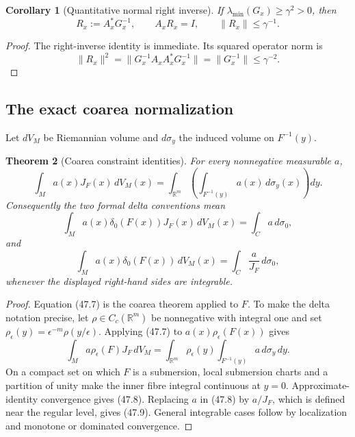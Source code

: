 \documentclass[11pt]{article}
\newtheorem{theorem}{Theorem}[section]
\newtheorem{corollary}[theorem]{Corollary}
\begin{document}
\begin{corollary}[Quantitative normal right inverse]
\label{cor:v11v47-right-inverse}
If \(\lambda_{\min}(G_x)\ge\gamma^2>0\), then
\[
             R_x:=A_x^*G_x^{-1},\qquad A_xR_x=I,\qquad
             \lVert R_x\rVert\le\gamma^{-1}.                 \tag{47.6}
\]
\end{corollary}

\begin{proof}
The right-inverse identity is immediate.  Its squared operator norm is
\[
 \lVert R_x\rVert^2
 =\lVert G_x^{-1}A_xA_x^*G_x^{-1}\rVert
 =\lVert G_x^{-1}\rVert\le\gamma^{-2}.
\]
\end{proof}

\subsection{The exact coarea normalization}

Let \(dV_M\) be Riemannian volume and \(d\sigma_y\) the induced volume
on \(F^{-1}(y)\).

\begin{theorem}[Coarea constraint identities]
\label{thm:v11v47-coarea}
For every nonnegative measurable \(a\),
\[
 \int_M a(x)J_F(x)\,dV_M(x)
 =\int_{\mathbb R^m}
      \left(\int_{F^{-1}(y)}a(x)\,d\sigma_y(x)\right)dy.       \tag{47.7}
\]
Consequently the two formal delta conventions mean
\[
 \int_M a(x)\delta_0(F(x))J_F(x)\,dV_M(x)
       =\int_Ca\,d\sigma_0,                                   \tag{47.8}
\]
and
\[
 \int_M a(x)\delta_0(F(x))\,dV_M(x)
       =\int_C\frac{a}{J_F}\,d\sigma_0,                        \tag{47.9}
\]
whenever the displayed right-hand sides are integrable.
\end{theorem}

\begin{proof}
Equation (47.7) is the coarea theorem applied to \(F\).  To make the
delta notation precise, let
\(\rho\in C_c(\mathbb R^m)\) be nonnegative with integral one and set
\(\rho_\epsilon(y)=\epsilon^{-m}\rho(y/\epsilon)\).  Applying (47.7)
to \(a(x)\rho_\epsilon(F(x))\) gives
\[
 \int_M a\rho_\epsilon(F)J_F\,dV_M
 =\int_{\mathbb R^m}\rho_\epsilon(y)
       \int_{F^{-1}(y)}a\,d\sigma_y\,dy.                       \tag{47.10}
\]
On a compact set on which \(F\) is a submersion, local submersion
charts and a partition of unity make the inner fibre integral
continuous at \(y=0\).  Approximate-identity convergence gives (47.8).
Replacing \(a\) in (47.8) by \(a/J_F\), which is defined near the
regular level, gives (47.9).  General integrable cases follow by
localization and monotone or dominated convergence.
\end{proof}
\end{document}
